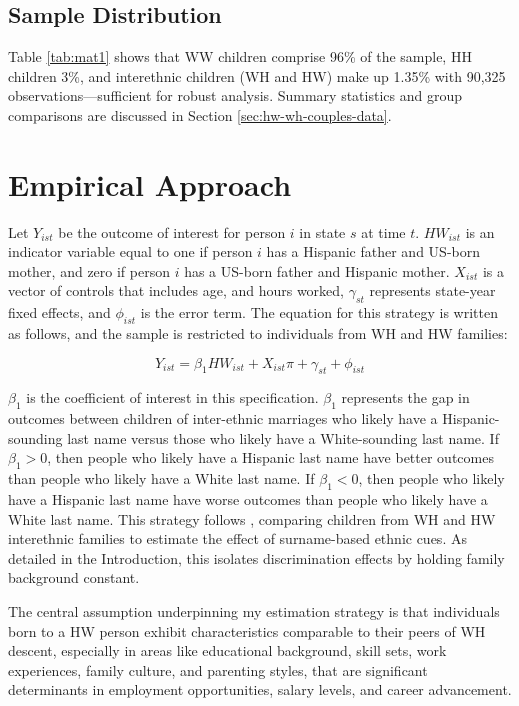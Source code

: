 \subsection{Sample Distribution}
Table \ref{tab:mat1} shows that WW children comprise 96\% of the sample, HH children 3\%, and interethnic children (WH and HW) make up 1.35\% with 90,325 observations—sufficient for robust analysis. Summary statistics and group comparisons are discussed in Section \ref{sec:hw-wh-couples-data}.

\section{Empirical Approach}\label{sec:emp_model}

Let $Y_{ist}$ be the outcome of interest for person $i$ in state $s$ at time $t$. $HW_{ist}$ is an indicator variable equal to one if person $i$ has a Hispanic father and US-born mother, and zero if person $i$ has a US-born father and Hispanic mother. $X_{ist}$ is a vector of controls that includes age, and hours worked, $\gamma_{st}$ represents state-year fixed effects, and $\phi_{ist}$ is the error term. The equation for this strategy is written as follows, and the sample is restricted to individuals from WH and HW families:

\begin{equation} \label{eq:1a}
Y_{ist} = \beta_{1} HW_{ist} + X_{ist} \pi + \gamma_{st} + \phi_{ist}
\end{equation}

$\beta_{1}$ is the coefficient of interest in this specification. $\beta_{1}$ represents the gap in outcomes between children of inter-ethnic marriages who likely have a Hispanic-sounding last name versus those who likely have a White-sounding last name. If $\beta_{1} > 0$, then people who likely have a Hispanic last name have better outcomes than people who likely have a White last name. If $\beta_{1} < 0$, then people who likely have a Hispanic last name have worse outcomes than people who likely have a White last name. This strategy follows \textcite{rubinstein2014pride}, comparing children from WH and HW interethnic families to estimate the effect of surname-based ethnic cues. As detailed in the Introduction, this isolates discrimination effects by holding family background constant.

The central assumption underpinning my estimation strategy is that individuals born to a HW person exhibit characteristics comparable to their peers of WH descent, especially in areas like educational background, skill sets, work experiences, family culture, and parenting styles, that are significant determinants in employment opportunities, salary levels, and career advancement.

